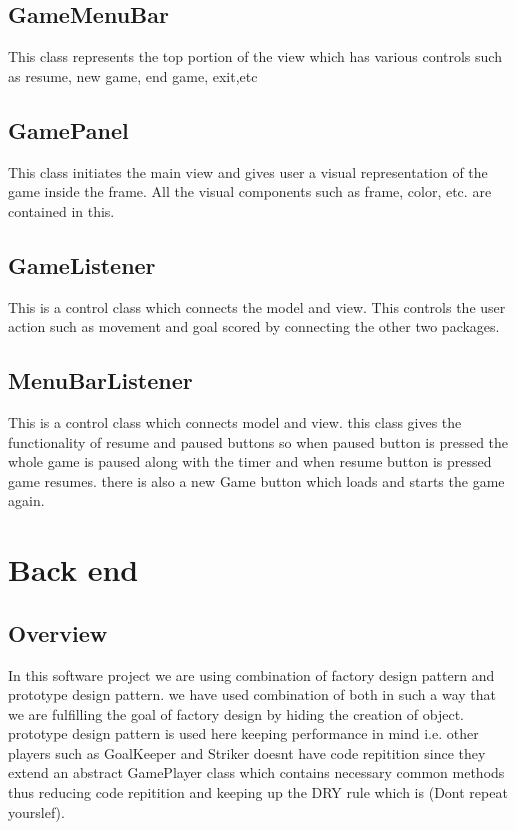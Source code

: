 \documentclass[12pt, dvipsnames, a4paper]{article}
\begin{document}
\subsection{GameMenuBar}
This class represents the top portion of the view which has various controls such as resume, new game, end game, exit,etc
\subsection{GamePanel}
This class initiates the main view and gives user a visual representation of the game inside the frame. All the visual components
such as frame, color, etc. are contained in this.
\subsection{GameListener}
This is a control class which connects the model and view. This controls the user action such as movement and goal scored by connecting
the other two packages.
\subsection{MenuBarListener}
This is a control class which connects model and view. this class gives the functionality of resume and paused buttons so when
paused button is pressed the whole game is paused along with the timer and when resume button is pressed game resumes. there is also
a new Game button which loads and starts the game again.
\clearpage

\section{Back end}
\subsection{Overview}
In this software project we are using combination of factory design pattern and prototype design pattern.
we have used combination of both in such a way that we are fulfilling the goal of factory design by hiding the
creation of object. prototype design pattern is used here keeping performance in mind i.e. other players such as
GoalKeeper and Striker doesnt have code repitition since they extend an abstract GamePlayer class which contains
necessary common methods thus reducing code repitition and keeping up the DRY rule which is (Dont repeat yourslef).
\end{document}
